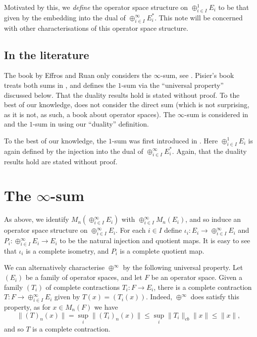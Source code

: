 \documentclass[a4paper,11pt]{article}
\theoremstyle{plain}
\theoremstyle{definition}
\begin{document}
Motivated by this, we \emph{define} the operator space structure on
$\oplus_{i\in I}^1 E_i$ to be that given by the embedding into the dual of
$\oplus_{i\in I}^\infty E_i^*$.  This note will be concerned with other characterisations
of this operator space structure.


\subsection{In the literature}

The book by Effros and Ruan only considers the $\infty$-sum, see \cite[page~38]{er}.
Pisier's book treats both sums in \cite[Section~2.6]{pis}, and defines the $1$-sum
via the ``universal property'' discussed below.  That the duality results
hold is stated without proof.  To the best of our knowledge, \cite{pau} does not consider
the direct sum (which is not surprising, as it is not, as such, a book about operator
spaces).  The $\infty$-sum is considered in \cite[Section~1.2.17]{blm} and the $1$-sum in
\cite[Section~1.4.13]{blm} using our ``duality'' definition.

To the best of our knowledge, the $1$-sum was first introduced in \cite[Section~3]{b}.
Here $\oplus_{i\in I}^1 E_i$ is again defined by the injection into the dual of
$\oplus_{i\in I}^\infty E_i^*$.  Again, that the duality results hold are stated without
proof.  



\section{The $\infty$-sum}

As above, we identify $M_n(\oplus_{i\in I}^\infty E_i)$ with $\oplus_{i\in I}^\infty M_n(E_i)$,
and so induce an operator space structure on $\oplus_{i\in I}^\infty E_i$.
For each $i\in I$ define $\iota_i:E_i\rightarrow 
\oplus_{i\in I}^\infty E_i$ and $P_i:\oplus_{i\in I}^\infty E_i \rightarrow E_i$ to be
the natural injection and quotient maps.  It is easy to see that $\iota_i$ is a
complete isometry, and $P_i$ is a complete quotient map.

We can alternatively characterise $\oplus^\infty$ by the following universal property.
Let $(E_i)$ be a family of operator spaces, and let $F$ be an operator space.
Given a family $(T_i)$ of complete contractions $T_i:F\rightarrow E_i$, there is a
complete contraction $T:F\rightarrow \oplus_{i\in I}^\infty E_i$ given by $T(x) = (T_i(x))$.
Indeed, $\oplus^\infty$ does satisfy this property, as for $x\in M_n(F)$ we have
\[ \|(T)_n(x)\| = \sup_i \|(T_i)_n(x)\| \leq \sup_i \|T_i\|_{cb} \|x\| \leq \|x\|, \]
and so $T$ is a complete contraction.
\end{document}
